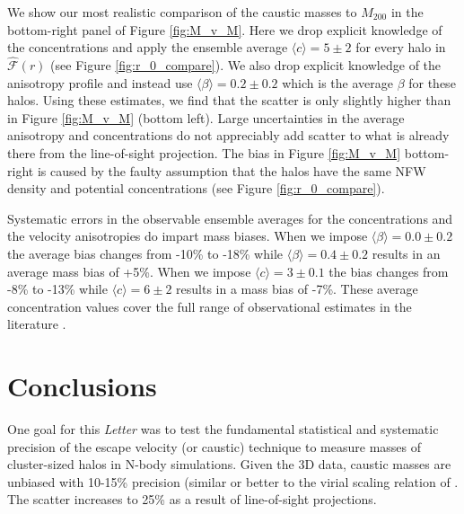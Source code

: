 \documentclass[iop]{emulateapj}
\begin{document}
    We show our most realistic comparison of the caustic masses to $M_{200}$ in the bottom-right panel of Figure \ref{fig:M_v_M}. Here we drop explicit knowledge of the concentrations and apply the ensemble average $\langle c \rangle =5 \pm{2}$ for every halo in $\hat{\mathcal{F}}(r)$ (see Figure \ref{fig:r_0_compare}). We also drop explicit knowledge of the anisotropy profile and instead use $\langle \beta \rangle = 0.2 \pm{0.2}$ which is the average $\beta$ for these halos. Using these estimates, we find that the scatter is only slightly higher than in Figure \ref{fig:M_v_M} (bottom left). Large uncertainties in the average anisotropy and concentrations do not appreciably add scatter to what is already there from the line-of-sight projection. The bias in Figure \ref{fig:M_v_M} bottom-right is caused by the faulty assumption that the halos have the same NFW density and potential concentrations (see Figure \ref{fig:r_0_compare}).

    Systematic errors in the observable ensemble averages for the concentrations and the velocity anisotropies do impart mass biases. When we impose $\langle \beta \rangle = 0.0 \pm{0.2}$  the average bias changes from -10\% to -18\% while $\langle \beta \rangle = 0.4 \pm{0.2}$ results in an average mass bias of +5\%. When we impose $\langle c \rangle = 3 \pm{0.1}$  the bias changes from -8\% to -13\% while $\langle c \rangle = 6 \pm{2}$ results in a mass bias of -7\%. These average concentration values cover the full range of observational estimates in the literature \citep{Carlberg97,LinMohr04,Wojtak10,Budzynski12}.
      
\section{Conclusions}
\label{sec:Discussion}

    One goal for this {\it Letter} was to test the fundamental statistical and systematic precision of the escape velocity (or caustic) technique to measure masses of cluster-sized halos in N-body simulations. Given the 3D data, caustic masses are unbiased with 10-15\% precision (similar or better to the virial scaling relation of \citet{Evrard08}. The scatter increases to 25\% as a result of line-of-sight projections.
     
\end{document}
